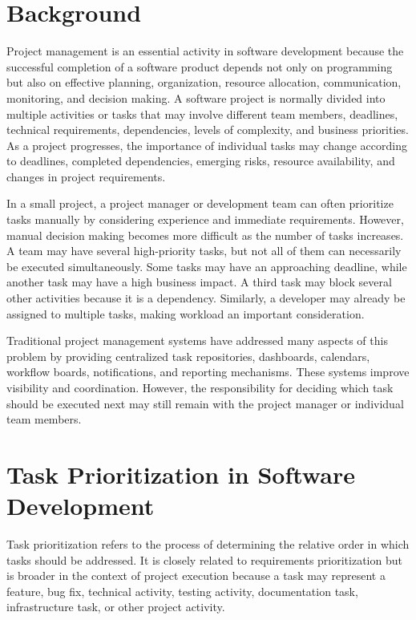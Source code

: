 \documentclass[12pt,a4paper,oneside]{report}
\begin{document}
\section{Background}

Project management is an essential activity in software development because the successful completion of a software product depends not only on programming but also on effective planning, organization, resource allocation, communication, monitoring, and decision making. A software project is normally divided into multiple activities or tasks that may involve different team members, deadlines, technical requirements, dependencies, levels of complexity, and business priorities. As a project progresses, the importance of individual tasks may change according to deadlines, completed dependencies, emerging risks, resource availability, and changes in project requirements.

In a small project, a project manager or development team can often prioritize tasks manually by considering experience and immediate requirements. However, manual decision making becomes more difficult as the number of tasks increases. A team may have several high-priority tasks, but not all of them can necessarily be executed simultaneously. Some tasks may have an approaching deadline, while another task may have a high business impact. A third task may block several other activities because it is a dependency. Similarly, a developer may already be assigned to multiple tasks, making workload an important consideration.

Traditional project management systems have addressed many aspects of this problem by providing centralized task repositories, dashboards, calendars, workflow boards, notifications, and reporting mechanisms. These systems improve visibility and coordination. However, the responsibility for deciding which task should be executed next may still remain with the project manager or individual team members.

\section{Task Prioritization in Software Development}

Task prioritization refers to the process of determining the relative order in which tasks should be addressed. It is closely related to requirements prioritization but is broader in the context of project execution because a task may represent a feature, bug fix, technical activity, testing activity, documentation task, infrastructure task, or other project activity.
\end{document}
